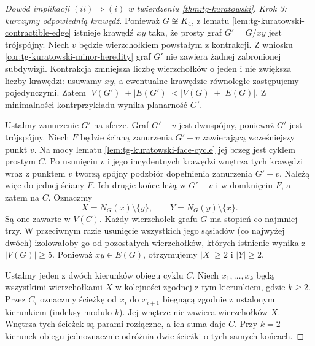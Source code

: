 \begin{proof}[Dowód implikacji
\texorpdfstring{$(ii)\Rightarrow(i)$}{(ii) => (i)}
w twierdzeniu \ref{thm:tg-kuratowski}]
\emph{Krok 3: kurczymy
odpowiednią krawędź.}
Ponieważ $G\not\cong K_4$,
z lematu
\ref{lem:tg-kuratowski-contractible-edge}
istnieje krawędź $xy$
taka, że prosty graf
$G'=G/xy$ jest
trójspójny.
Niech $v$ będzie
wierzchołkiem powstałym
z kontrakcji.
Z wniosku
\ref{cor:tg-kuratowski-minor-heredity}
graf $G'$ nie zawiera
żadnej zabronionej
subdywizji.
Kontrakcja zmniejsza liczbę wierzchołków o jeden
i nie zwiększa liczby krawędzi: usuwamy $xy$,
a ewentualne krawędzie równoległe zastępujemy
pojedynczymi. Zatem
$|V(G')|+|E(G')|<|V(G)|+|E(G)|$.
Z minimalności kontrprzykładu wynika planarność $G'$.

Ustalmy zanurzenie
$G'$ na sferze.
Graf $G'-v$ jest
dwuspójny, ponieważ
$G'$ jest trójspójny.
Niech $F$ będzie
ścianą zanurzenia
$G'-v$ zawierającą
wcześniejszy punkt $v$.
Na mocy lematu
\ref{lem:tg-kuratowski-face-cycle}
jej brzeg jest
cyklem prostym $C$.
Po usunięciu $v$ i jego incydentnych krawędzi
wnętrza tych krawędzi wraz z punktem $v$ tworzą
spójny podzbiór dopełnienia zanurzenia $G'-v$.
Należą więc do jednej ściany $F$. Ich drugie końce
leżą w $G'-v$ i w domknięciu $F$, a zatem na $C$.
Oznaczmy
\[
X=N_G(x)\setminus\{y\},
\qquad
Y=N_G(y)\setminus\{x\}.
\]
Są one zawarte
w $V(C)$.
Każdy wierzchołek grafu $G$ ma stopień co najmniej
trzy. W przeciwnym razie usunięcie wszystkich jego
sąsiadów (co najwyżej dwóch) izolowałoby go od
pozostałych wierzchołków, których istnienie wynika
z $|V(G)|\geq5$. Ponieważ $xy\in E(G)$, otrzymujemy
$|X|\geq2$ i $|Y|\geq2$.

Ustalmy jeden z dwóch kierunków obiegu cyklu $C$.
Niech $x_1,\ldots,x_k$ będą wszystkimi
wierzchołkami $X$ w kolejności zgodnej z tym
kierunkiem, gdzie $k\geq2$.
Przez $C_i$ oznaczmy ścieżkę od $x_i$ do $x_{i+1}$
biegnącą zgodnie z ustalonym kierunkiem
(indeksy modulo $k$). Jej wnętrze nie zawiera
wierzchołków $X$. Wnętrza tych ścieżek są parami
rozłączne, a ich suma daje $C$.
Przy $k=2$ kierunek obiegu jednoznacznie odróżnia
dwie ścieżki o tych samych końcach.


\end{proof}
